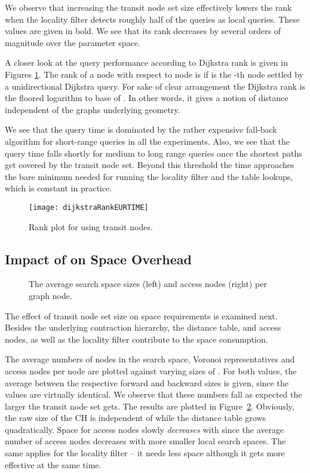 \documentclass{llncs}
\begin{document}
We observe that increasing the transit node set size effectively lowers the rank when the locality filter detects roughly half of the queries as local queries.
These values are given in bold.
We see that its rank decreases by several orders of magnitude over the parameter space.

A closer look at the query performance according to Dijkstra rank is given in Figures \ref{fig:rankPlots_time}.
The rank of a node  with respect to node  is  if  is the -th node settled by a unidirectional Dijkstra query.
For sake of clear arrangement the Dijkstra rank  is the floored logarithm to base  of .
In other words, it gives a notion of distance independent of the graphs underlying geometry.

We see that the query time is dominated by the rather expensive fall-back algorithm for short-range queries in all the experiments.
Also, we see that the query time falls shortly for medium to long range queries once the shortest paths get covered by the transit node set.
Beyond this threshold the time approaches the bare minimum needed for running the locality filter and the table lookups, which is constant in practice.

\begin{figure}[bht]
\centering
    \texttt{[image: dijkstraRankEURTIME]}
    \caption{Rank plot for using  transit nodes.}
    \label{fig:rankPlots_time}
\end{figure}

\subsection{Impact of  on Space Overhead}
\begin{figure}[bth]
\centering
{}
\caption{The average search space sizes (left) and access nodes (right) per graph node.}
\label{fig:nodesPerNode}
\end{figure}

The effect of transit node set size on space requirements is examined next.
Besides the underlying contraction hierarchy, the distance table, and access nodes, as well as the locality filter contribute to the space consumption.

The average numbers of nodes in the search space, Voronoi representatives and access nodes per node are plotted against varying sizes of .
For both values, the average between the respective forward and backward sizes is given, since the values are virtually identical.
We observe that these numbers fall as expected the larger the transit node set gets.
The results are plotted in Figure~\ref{fig:nodesPerNode}.
Obviously, the raw size of the CH is independent of  while the distance table grows quadratically. 
Space for access nodes slowly \emph{decreases} with  since the average number of access nodes decreases with more smaller local search spaces.
The same applies for the locality filter -- it needs less space although it gets more effective at the same time.
\end{document}
